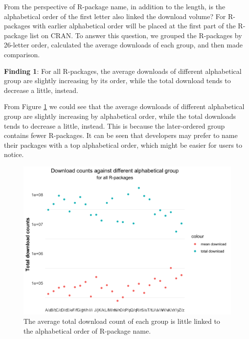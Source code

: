 \documentclass[
]{book}
\newenvironment{discovery}[1]{%
  \begin{tcolorbox}[colback=blue!30,colframe=blue!80!black]#1}{\end{tcolorbox}}
\begin{document}
From the perspective of R-package name, in addition to the length, is the alphabetical order of the first letter also linked the download volume? For R-packages with earlier alphabetical order will be placed at the first part of the R-package list on CRAN\autocite{cranpkgsname}. To answer this question, we grouped the R-packages by 26-letter order, calculated the average downloads of each group, and then made comparison.

\begin{discovery}
\textbf{Finding 1}: For all R-packages, the average downloads of
different alphabetical group are slightly increasing by its order, while
the total download tends to decrease a little, instead.
\end{discovery}

From Figure \ref{fig:ahlpha-downloads} we could see that the average downloads of different alphabetical group are slightly increasing by alphabetical order, while the total downloads tends to decrease a little, instead. This is because the later-ordered group contains fewer R-packages. It can be seen that developers may prefer to name their packages with a top alphabetical order, which might be easier for users to notice.



\begin{figure}

{\centering \includegraphics{figures/ahlpha-downloads-1} 

}

\caption{The average total download count of each group is little linked to the alphabetical order of R-package name.}\label{fig:ahlpha-downloads}
\end{figure}
\end{document}
